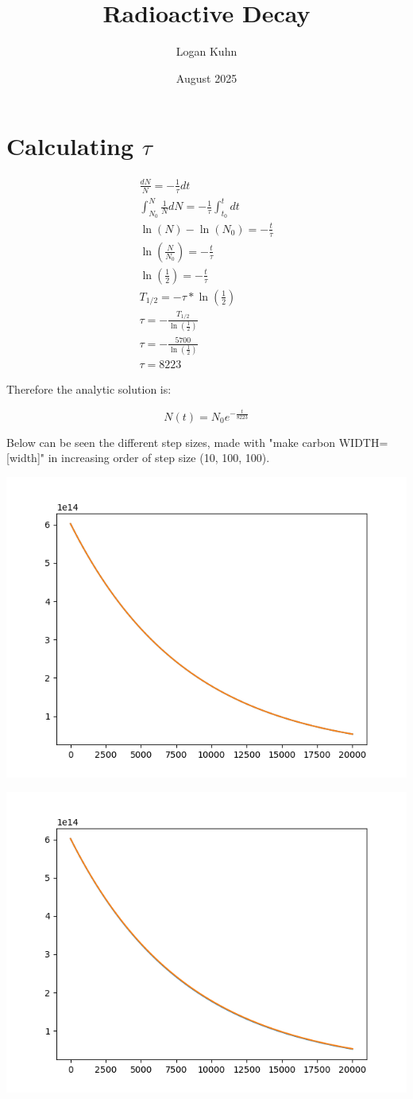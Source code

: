 \documentclass{article}
\title{Radioactive Decay}
\author{Logan Kuhn}
\date{August 2025}
\begin{document}
\maketitle

\section*{Calculating $\tau$}

\begin{gather*}
    \frac{dN}{N}=-\frac{1}{\tau}dt \\
    \int_{N_0}^N\frac{1}{N}dN=-\frac{1}{\tau}\int_{t_0}^t dt \\
    \ln(N)-\ln(N_0)=-\frac{t}{\tau} \\
    \ln\left(\frac{N}{N_0}\right)=-\frac{t}{\tau} \\
    \ln\left(\frac{1}{2}\right)=-\frac{t}{\tau} \\
    T_{1/2}=-\tau*\ln\left(\frac{1}{2}\right) \\
    \tau=-\frac{T_{1/2}}{\ln\left(\frac{1}{2}\right)} \\
    \tau = -\frac{5700}{\ln\left(\frac{1}{2}\right)} \\
    \tau = 8223
\end{gather*}

Therefore the analytic solution is:

$$N(t)=N_0e^{-\frac{t}{8223}}$$

Below can be seen the different step sizes, made with "make carbon WIDTH=[width]" in increasing order of step size (10, 100, 100).

\includegraphics[width=.5\textwidth]{carbonWidth10.png}

\includegraphics[width=.5\textwidth]{carbonWidth100.png}
\end{document}
